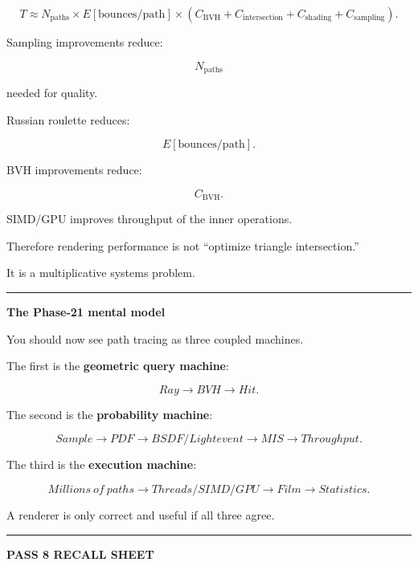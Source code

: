 \[
T
\approx
N_{\text{paths}}
\times
E[\text{bounces/path}]
\times
(
C_{\text{BVH}}
+
C_{\text{intersection}}
+
C_{\text{shading}}
+
C_{\text{sampling}}
).
\]

Sampling improvements reduce:

\[
N_{\text{paths}}
\]

needed for quality.

Russian roulette reduces:

\[
E[\text{bounces/path}].
\]

BVH improvements reduce:

\[
C_{\text{BVH}}.
\]

SIMD/GPU improves throughput of the inner operations.

Therefore rendering performance is not ``optimize triangle intersection.''

It is a multiplicative systems problem.

\begin{center}\rule{0.5\linewidth}{0.5pt}\end{center}

\textbf{The Phase-21 mental model}

You should now see path tracing as three coupled machines.

The first is the \textbf{geometric query machine}:

\[
Ray
\rightarrow
BVH
\rightarrow
Hit.
\]

The second is the \textbf{probability machine}:

\[
Sample
\rightarrow
PDF
\rightarrow
BSDF/Light event
\rightarrow
MIS
\rightarrow
Throughput.
\]

The third is the \textbf{execution machine}:

\[
Millions\ of\ paths
\rightarrow
Threads/SIMD/GPU
\rightarrow
Film
\rightarrow
Statistics.
\]

A renderer is only correct and useful if all three agree.

\begin{center}\rule{0.5\linewidth}{0.5pt}\end{center}

\textbf{PASS 8 RECALL SHEET}

